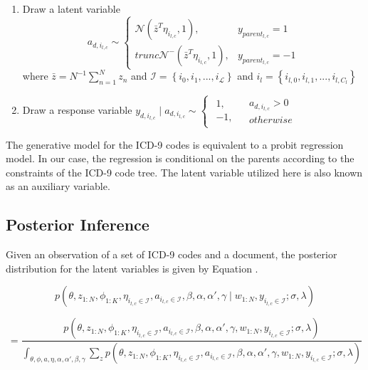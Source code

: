 \documentclass{article}
\begin{document}
\begin{enumerate}
\begin{enumerate}
\begin{enumerate}
\begin{enumerate}
\item Draw a latent variable \[
a_{d,i_{l,c}}\sim\begin{cases}
\mathcal{N}\left(\bar{z}^{T}\eta_{i_{l,c}},1\right), & y_{parent_{l,c}}=1\\
trunc\mathcal{N}^{-}\left(\bar{z}^{T}\eta_{i_{l,c}},1\right), & y_{parent_{l,c}}=-1\end{cases}\]
 where $\bar{z}=N^{-1}\sum_{n=1}^{N}z_{n}$ and $\mathcal{I}=\left\{ i_{0},i_{1},...,i_{\mathcal{L}}\right\} $
and $i_{l}=\left\{ i_{l,0},i_{l,1},...,i_{l,C_{l}}\right\} $
\item Draw a response variable $y_{d,i_{l,c}}\mid a_{d,i_{l,c}}\sim\begin{cases}
\begin{array}{c}
1,\\
-1,\end{array} & \begin{array}{c}
a_{d,i_{l,c}}>0\\
otherwise\end{array}\end{cases}$
\end{enumerate}
\end{enumerate}
\end{enumerate}
\end{enumerate}
The generative model for the ICD-9 codes is equivalent to a probit
regression model. In our case, the regression is conditional on the
parents according to the constraints of the ICD-9 code tree. The latent
variable utilized here is also known as an auxiliary variable.


\subsection{Posterior Inference}

Given an observation of a set of ICD-9 codes and a document, the posterior
distribution for the latent variables is given by Equation .

\begin{equation}
p\left(\theta,z_{1:N},\phi_{1:K},\eta_{i_{l,c}\in\mathcal{I}},a_{i_{l,c}\in\mathcal{I}},\beta,\alpha,\alpha',\gamma\mid w_{1:N},y_{i_{l,c}\in\mathcal{I}};\sigma,\lambda\right)\label{eq:Posterior}\end{equation}


\[
=\frac{p\left(\theta,z_{1:N},\phi_{1:K},\eta_{i_{l,c}\in\mathcal{I}},a_{i_{l,c}\in\mathcal{I}},\beta,\alpha,\alpha',\gamma,w_{1:N},y_{i_{l,c}\in\mathcal{I}};\sigma,\lambda\right)}{\int_{\theta,\phi,a,\eta,\alpha,\alpha',\beta,\gamma}\sum_{z}p\left(\theta,z_{1:N},\phi_{1:K},\eta_{i_{l,c}\in\mathcal{I}},a_{i_{l,c}\in\mathcal{I}},\beta,\alpha,\alpha',\gamma,w_{1:N},y_{i_{l,c}\in\mathcal{I}};\sigma,\lambda\right)}\]
\end{document}
